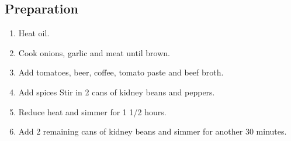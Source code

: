 \subsection{Preparation}
\begin{enumerate}
    \item Heat oil.
    \item Cook onions, garlic and meat until brown.
    \item Add tomatoes, beer, coffee, tomato paste and beef broth.
    \item Add spices Stir in 2 cans of kidney beans and peppers.
    \item Reduce heat and simmer for 1 1/2 hours.
    \item Add 2 remaining cans of kidney beans and simmer for another 30 minutes.
\end{enumerate}
